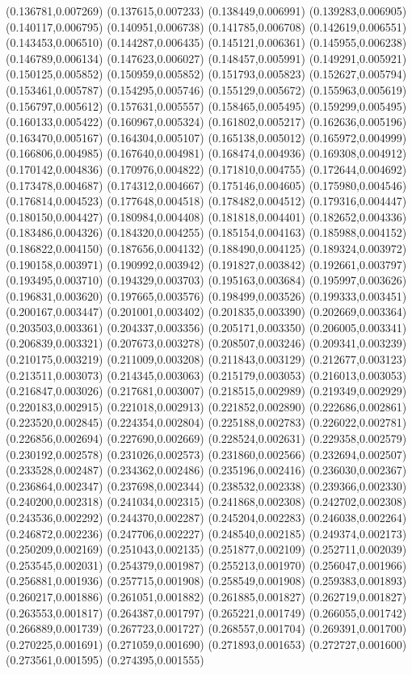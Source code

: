 {(0.136781,0.007269) (0.137615,0.007233) (0.138449,0.006991) (0.139283,0.006905) (0.140117,0.006795) (0.140951,0.006738) (0.141785,0.006708) (0.142619,0.006551) (0.143453,0.006510) (0.144287,0.006435) (0.145121,0.006361) (0.145955,0.006238) (0.146789,0.006134) (0.147623,0.006027) (0.148457,0.005991) (0.149291,0.005921) (0.150125,0.005852) (0.150959,0.005852) (0.151793,0.005823) (0.152627,0.005794) (0.153461,0.005787) (0.154295,0.005746) (0.155129,0.005672) (0.155963,0.005619) (0.156797,0.005612) (0.157631,0.005557) (0.158465,0.005495) (0.159299,0.005495) (0.160133,0.005422) (0.160967,0.005324) (0.161802,0.005217) (0.162636,0.005196) (0.163470,0.005167) (0.164304,0.005107) (0.165138,0.005012) (0.165972,0.004999) (0.166806,0.004985) (0.167640,0.004981) (0.168474,0.004936) (0.169308,0.004912) (0.170142,0.004836) (0.170976,0.004822) (0.171810,0.004755) (0.172644,0.004692) (0.173478,0.004687) (0.174312,0.004667) (0.175146,0.004605) (0.175980,0.004546) (0.176814,0.004523) (0.177648,0.004518) (0.178482,0.004512) (0.179316,0.004447) (0.180150,0.004427) (0.180984,0.004408) (0.181818,0.004401) (0.182652,0.004336) (0.183486,0.004326) (0.184320,0.004255) (0.185154,0.004163) (0.185988,0.004152) (0.186822,0.004150) (0.187656,0.004132) (0.188490,0.004125) (0.189324,0.003972) (0.190158,0.003971) (0.190992,0.003942) (0.191827,0.003842) (0.192661,0.003797) (0.193495,0.003710) (0.194329,0.003703) (0.195163,0.003684) (0.195997,0.003626) (0.196831,0.003620) (0.197665,0.003576) (0.198499,0.003526) (0.199333,0.003451) (0.200167,0.003447) (0.201001,0.003402) (0.201835,0.003390) (0.202669,0.003364) (0.203503,0.003361) (0.204337,0.003356) (0.205171,0.003350) (0.206005,0.003341) (0.206839,0.003321) (0.207673,0.003278) (0.208507,0.003246) (0.209341,0.003239) (0.210175,0.003219) (0.211009,0.003208) (0.211843,0.003129) (0.212677,0.003123) (0.213511,0.003073) (0.214345,0.003063) (0.215179,0.003053) (0.216013,0.003053) (0.216847,0.003026) (0.217681,0.003007) (0.218515,0.002989) (0.219349,0.002929) (0.220183,0.002915) (0.221018,0.002913) (0.221852,0.002890) (0.222686,0.002861) (0.223520,0.002845) (0.224354,0.002804) (0.225188,0.002783) (0.226022,0.002781) (0.226856,0.002694) (0.227690,0.002669) (0.228524,0.002631) (0.229358,0.002579) (0.230192,0.002578) (0.231026,0.002573) (0.231860,0.002566) (0.232694,0.002507) (0.233528,0.002487) (0.234362,0.002486) (0.235196,0.002416) (0.236030,0.002367) (0.236864,0.002347) (0.237698,0.002344) (0.238532,0.002338) (0.239366,0.002330) (0.240200,0.002318) (0.241034,0.002315) (0.241868,0.002308) (0.242702,0.002308) (0.243536,0.002292) (0.244370,0.002287) (0.245204,0.002283) (0.246038,0.002264) (0.246872,0.002236) (0.247706,0.002227) (0.248540,0.002185) (0.249374,0.002173) (0.250209,0.002169) (0.251043,0.002135) (0.251877,0.002109) (0.252711,0.002039) (0.253545,0.002031) (0.254379,0.001987) (0.255213,0.001970) (0.256047,0.001966) (0.256881,0.001936) (0.257715,0.001908) (0.258549,0.001908) (0.259383,0.001893) (0.260217,0.001886) (0.261051,0.001882) (0.261885,0.001827) (0.262719,0.001827) (0.263553,0.001817) (0.264387,0.001797) (0.265221,0.001749) (0.266055,0.001742) (0.266889,0.001739) (0.267723,0.001727) (0.268557,0.001704) (0.269391,0.001700) (0.270225,0.001691) (0.271059,0.001690) (0.271893,0.001653) (0.272727,0.001600) (0.273561,0.001595) (0.274395,0.001555) }
